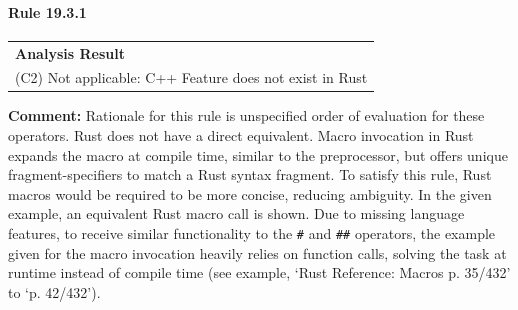\paragraph{Rule 19.3.1}
\begin{longtable}{p{13cm}}
\textbf{Analysis Result} \\
(C2) Not applicable: C++ Feature does not exist in Rust \\
\end{longtable}
\textbf{Comment:} Rationale for this rule is unspecified order of evaluation for these operators. Rust does not have a direct equivalent. Macro invocation in Rust expands the macro at compile time, similar to the \Cpp preprocessor, but offers unique fragment-specifiers to match a Rust syntax fragment. To satisfy this rule, Rust macros would be required to be more concise, reducing ambiguity. In the given example, an equivalent Rust macro call is shown. Due to missing language features, to receive similar functionality to the \texttt{\#} and \texttt{\#\#} operators, the example given for the macro invocation heavily relies on function calls, solving the task at runtime instead of compile time (see example, `Rust Reference: Macros p. 35/432' to `p. 42/432'). \\



